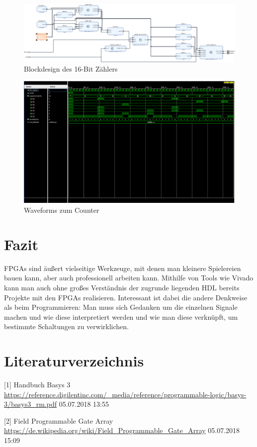\documentclass[11pt, a4paper]{article}
\begin{document}
\begin{figure}[H]    
    \centering
    \includegraphics[width=\linewidth]{versuch7Data/counter.pdf}
    \caption{Blockdesign des 16-Bit Zählers}
    \label{aufbauZähler}        
\end{figure}
\begin{figure}[H]    
    \centering
    \includegraphics[width=\linewidth]{versuch7Data/counter.png}
    \caption{Waveforms zum Counter}
    \label{waveformCounter}        
\end{figure}

\section*{Fazit}
FPGAs sind äußert vielseitige Werkzeuge, mit denen man kleinere Spielereien bauen kann, aber auch professionell arbeiten kann. Mithilfe von Tools wie Vivado kann man auch ohne großes Verständnis der zugrunde liegenden HDL bereits Projekte mit den FPGAs realisieren. Interessant ist dabei die andere Denkweise als beim Programmieren: Man muss sich Gedanken um die einzelnen Signale machen und wie diese interpretiert werden und wie man diese verknüpft, um bestimmte Schaltungen zu verwirklichen.

\section*{Literaturverzeichnis}
[1] Handbuch Basys 3 \\
\url{https://reference.digilentinc.com/_media/reference/programmable-logic/basys-3/basys3_rm.pdf}     05.07.2018 13:55

[2] Field Programmable Gate Array \\
\url{https://de.wikipedia.org/wiki/Field_Programmable_Gate_Array} 05.07.2018 15:09
\end{document}
